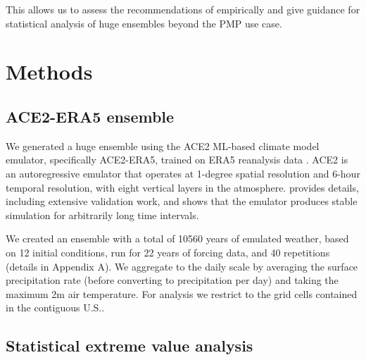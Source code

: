 \documentclass{ametsocV6.1}
\begin{document}
This allows us to assess the recommendations of \citet{nasem2024pmp} empirically and give guidance for statistical analysis of huge ensembles beyond the PMP use case. 


\section{Methods}

\subsection{ACE2-ERA5 ensemble}

We generated a huge ensemble using the ACE2 ML-based climate model emulator, specifically ACE2-ERA5, trained on ERA5 reanalysis data \citep{watt2025ace2}. ACE2 is an autoregressive emulator that operates at 1-degree spatial resolution and 6-hour temporal resolution, with eight vertical layers in the atmosphere. \cite{watt2025ace2} provides details, including extensive validation work, and shows that the emulator produces stable simulation for arbitrarily long time intervals.

We created an ensemble with a total of 10560 years of emulated weather, based on 12 initial conditions, run for 22 years of forcing data, and 40 repetitions (details in Appendix A). We aggregate to the daily scale by averaging the surface precipitation rate (before converting to precipitation per day) and taking the maximum 2m air temperature. For analysis we restrict to the grid cells contained in the contiguous U.S.. 

\subsection{Statistical extreme value analysis}

\end{document}
